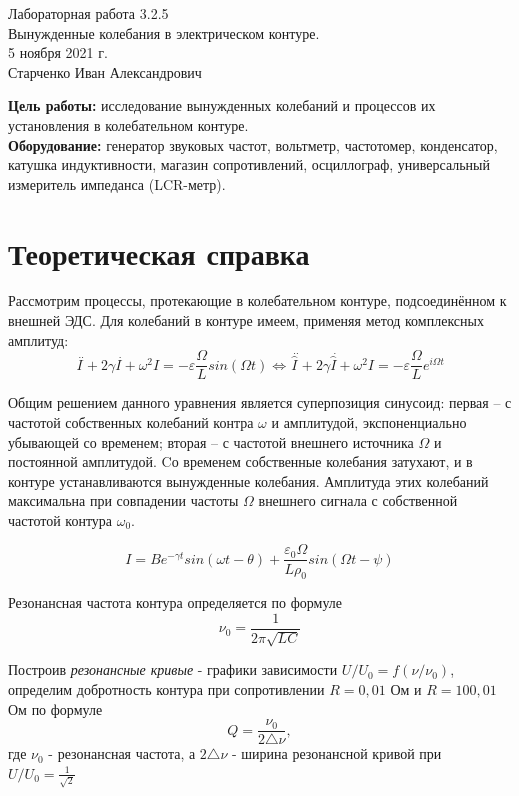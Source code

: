 \documentclass[a4paper, fontsize = 14pt]{article}
\begin{document}
\begin{center}
  \LARGE{Лабораторная работа 3.2.5}\\[0.2cm]
  \LARGE{Вынужденные колебания в электрическом контуре.}\\[0.2cm]
  \large{5 ноября 2021 г.}\\[0.2cm]
  \large{Старченко Иван Александрович}\\[0.2cm]
\end{center}

\textbf{Цель работы:} исследование вынужденных колебаний и процессов их установления в колебательном контуре.
\\

\textbf{Оборудование:} генератор звуковых частот, вольтметр, частотомер, конденсатор, катушка индуктивности, магазин сопротивлений, осциллограф, универсальный измеритель импеданса (LCR-метр).


\section{Теоретическая справка}
\par Рассмотрим процессы, протекающие в колебательном контуре, подсоединённом к внешней ЭДС. Для колебаний в контуре имеем, применяя метод комплексных амплитуд: 
$$ \overset{\,\,..}{I} + 2\gamma \overset{\,\,.}{I}+\omega^2 I = -\varepsilon \frac{\Omega}{L} sin (\Omega t)   \Leftrightarrow  \overset{ \,\,..}{\widehat{I}} + 2\gamma \overset{\,\,.}{\widehat{I} } + \omega^2 I = -\varepsilon \frac{\Omega}{L} e^{i\Omega t} $$


\par Общим решением данного уравнения является суперпозиция синусоид: первая -- с частотой собственных колебаний контра $ \omega $ и амплитудой, экспоненциально убывающей со временем; вторая -- с частотой внешнего источника $ \Omega $ и постоянной амплитудой. Cо временем собственные колебания затухают, и в контуре устанавливаются вынужденные колебания. Амплитуда этих колебаний максимальна при совпадении частоты $ \Omega $ внешнего сигнала с собственной частотой контура $ \omega_0 $. 

\[ I = B e^{-\gamma t} sin(\omega t -\theta) + \frac{\varepsilon_0 \Omega}{L \rho_0} sin(\Omega t -\psi) \]


Резонансная частота контура определяется по формуле 
\begin{equation}
    \nu_0 = \frac{1}{2\pi \sqrt{LC}}
\end{equation}

Построив \textit{резонансные кривые} - графики зависимости $U/U_0 = f (\nu / \nu_0)$, определим добротность контура при сопротивлении $R = 0,01$ Ом и $R = 100,01$ Ом по формуле 
\begin{equation}
    Q = \frac{\nu_0}{2\triangle \nu},
\end{equation}
    где $\nu_0$ - резонансная частота, а $2\triangle \nu$ - ширина резонансной кривой при $U/U_0 = \frac{1}{\sqrt{2}}$ 
    
\end{document}
